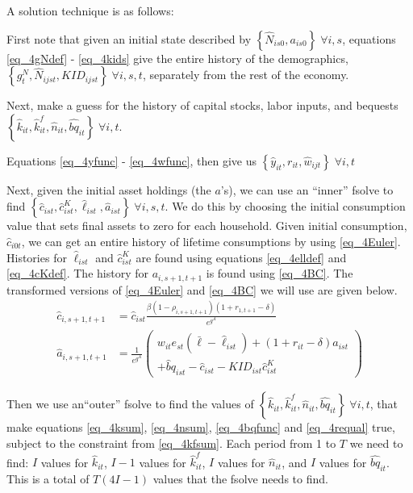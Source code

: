 \documentclass[letterpaper,12pt]{article}
\theoremstyle{definition}
\numberwithin{equation}{section}
\begin{document}
\begin{spacing}{1.5}
	A solution technique is as follows:

	First note that given an initial state described by $\left\{ \hat N_{is0}, a_{is0} \right\}\; \forall i,s$, equations \eqref{eq_4gNdef} - \eqref{eq_4kids} give the entire history of the demographics, $\left\{ g^N_t, \hat N_{ijst}, {KID}_{ijst} \right\}\; \forall i,s,t$, separately from the rest of the economy.

	Next, make a guess for the history of capital stocks, labor inputs, and bequests $\left\{ \hat k_{it}, \hat k^f_{it}, \hat n_{it}, \hat{bq}_{it} \right\}\; \forall i,t$.

	Equations \eqref{eq_4yfunc} - \eqref{eq_4wfunc}, then give us $\left\{ \hat y_{it}, r_{it}, \hat w_{ijt} \right\}\; \forall i,t$

	Next, given the initial asset holdings (the $a$'s), we can use an ``inner'' fsolve to find $\left\{ \hat c_{ist}, \hat c^K_{ist}, \hat \ell_{ist}, \hat a_{ist} \right\}\; \forall i,s,t$.  We do this by choosing the initial consumption value that sets final assets to zero for each household.  Given initial consumption, $\hat c_{i0t}$, we can get an entire history of lifetime consumptions by using \eqref{eq_4Euler}.  Histories for $\hat \ell_{ist}$ and $\hat c^K_{ist}$ are found using equations \eqref{eq_4elldef} and \eqref{eq_4cKdef}.  The history for $a_{i,s+1,t+1}$ is found using \eqref{eq_4BC}.  The transformed versions of \eqref{eq_4Euler} and \eqref{eq_4BC} we will use are given below.
	\begin{align}
		\hat c_{i,s+1,t+1} & = \hat c_{ist} \frac{\beta (1-\rho_{i,s+1,t+1})(1+r_{1,t+1}-\delta)} {e^{g^A}} \nonumber \\
		\hat a_{i,s+1,t+1} & = \frac{1}{e^{g^A}}\begin{pmatrix} w_{it} e_{st} (\bar \ell - \hat \ell_{ist}) + (1+r_{it}-\delta)\hat a_{ist} \\ +\hat bq_{ist} - \hat c_{ist} - {KID}_{ist} \hat c^K_{ist} \end{pmatrix} \nonumber
	\end{align}

	Then we use an``outer'' fsolve to find the values of $\left\{ \hat k_{it}, \hat k^f_{it}, \hat n_{it}, \hat{bq}_{it} \right\}\; \forall i,t$, that make equations \eqref{eq_4ksum}, \eqref{eq_4nsum}, \eqref{eq_4bqfunc} and \eqref{eq_4requal} true, subject to the constraint from \eqref{eq_4kfsum}.  Each period from 1 to $T$ we need to find: $I$ values for $\hat k_{it}$, $I-1$ values for $\hat k^f_{it}$, $I$ values for $\hat n_{it}$, and $I$ values for $\hat{bq}_{it}$.  This is a total of $T(4I-1)$ values that the fsolve needs to find.




\end{spacing}
\end{document}
